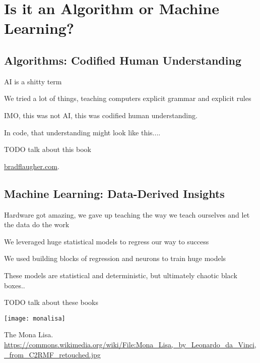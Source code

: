 \setchapterpreamble[u]{\margintoc}
\chapter{Is it an Algorithm or Machine Learning?}

\section{Algorithms: Codified Human Understanding}

AI is a shitty term

We tried a lot of things, teaching computers explicit grammar and explicit rules

IMO, this was not AI, this was codified human understanding.

In code, that understanding might look like this.... %

TODO talk about this book 

\href{https://bradflaugher.com}{bradflaugher.com}.  


\section{Machine Learning: Data-Derived Insights}

Hardware got amazing, we gave up teaching the way we teach ourselves and let the data do the work

We leveraged huge statistical models to regress our way to success

We used building blocks of regression and neurons to train huge models

These models are statistical and deterministic, but ultimately chaotic black boxes..

TODO talk about these books \cite{MacAskill2022} \cite{Metz2022Sep} \cite{Metz2022Sep2} \cite{Aytekin}


\begin{marginfigure}[-5.5cm]
	\texttt{[image: monalisa]}
	\caption[The Mona Lisa]{The Mona Lisa.\\ 
	\url{https://commons.wikimedia.org/wiki/File:Mona_Lisa,_by_Leonardo_da_Vinci,_from_C2RMF_retouched.jpg}}
\end{marginfigure}
